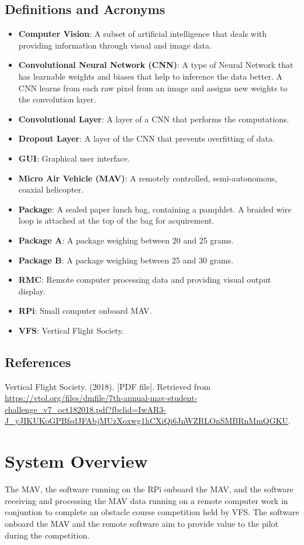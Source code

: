 \documentclass[onecolumn, draftclsnofoot, 10pt, compsoc]{IEEEtran}
\begin{document}
\subsection{Definitions and Acronyms}
\begin{itemize}
\item \textbf{Computer Vision}: A subset of artificial intelligence that deals with providing information through visual and image data.
\item \textbf{Convolutional Neural Network (CNN)}: A type of Neural Network that has learnable weights and biases that help to inference the data better. A CNN learns from each raw pixel from an image and assigns new weights to the convolution layer.
\item \textbf{Convolutional Layer}: A layer of a CNN that performs the computations.
\item \textbf{Dropout Layer}: A layer of the CNN that prevents overfitting of data.
\item \textbf{GUI}: Graphical user interface.
\item \textbf{Micro Air Vehicle (MAV)}: A remotely controlled, semi-autonomous, coaxial helicopter.
\item \textbf{Package}: A sealed paper lunch bag, containing a pamphlet. A braided wire loop is attached at the top of the bag for acquirement.
\item \textbf{Package A}: A package weighing between 20 and 25 grams.
\item \textbf{Package B}: A package weighing between 25 and 30 grams.
\item \textbf{RMC}: Remote computer processing data and providing visual output display.
\item \textbf{RPi}: Small computer onboard MAV.
\item \textbf{VFS}: Vertical Flight Society.

\end{itemize}

\subsection{References}
\newblock [1]
\newblock Vertical Flight Society. (2018).
 [PDF file].
\newblock Retrieved from \url{ https://vtol.org/files/dmfile/7th-annual-mav-student-challenge\_v7\_oct182018.pdf?fbclid=IwAR3-J\_yJIKUKoGPBfsdJFAbjMUzXoxwg1hCXiQi6JnWZRLOnSMBRnMmQGKU}.

\section{System Overview}
The MAV, the software running on the RPi onboard the MAV, and the software receiving and processing the MAV data running on a remote computer work in conjuntion to complete an obstacle course competition held by VFS. The software onboard the MAV and the remote software aim to provide value to the pilot during the competition.
\end{document}
